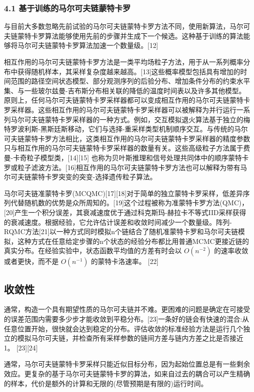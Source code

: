 \subsubsection{4.1 基于训练的马尔可夫链蒙特卡罗}

与目前大多数忽略先前试验的马尔可夫链蒙特卡罗方法不同，使用新算法，马尔可夫链蒙特卡罗算法能够使用先前的步骤并生成下一个候选。这种基于训练的算法能够将马尔可夫链蒙特卡罗算法加速一个数量级。[12]

相互作用的马尔可夫链蒙特卡罗方法是一类平均场粒子方法，用于从一系列概率分布中获得随机样本，其采样复杂度越来越高。[13]这些概率模型包括具有增加的时间范围的路径空间状态模型、部分观测序列的后验分布、增加条件分布的约束水平集、与一些玻尔兹曼-吉布斯分布相关联的降低的温度时间表以及许多其他模型。原则上，任何马尔可夫链蒙特卡罗采样器都可以变成相互作用的马尔可夫链蒙特卡罗采样器。这些相互作用的马尔可夫链蒙特卡罗采样器可以被解释为并行运行一系列马尔可夫链蒙特卡罗采样器的一种方式。例如，交互模拟退火算法基于独立的梅特罗波利斯-黑斯廷斯移动，它们与选择-重采样类型机制顺序交互。与传统的马尔可夫链蒙特卡罗方法相比，这类相互作用的马尔可夫链蒙特卡罗采样器的精度参数只与相互作用的马尔可夫链蒙特卡罗采样器的数量有关。这些高级粒子方法属于费曼-卡奇粒子模型类，[14][15] 也称为贝叶斯推理和信号处理共同体中的顺序蒙特卡罗或粒子滤波方法。[16]相互作用的马尔可夫链蒙特卡罗方法也可以解释为带有马尔可夫链蒙特卡罗突变的突变-选择遗传粒子算法。

马尔可夫链准蒙特卡罗(MCQMC)[17][18]对于简单的独立蒙特卡罗采样，低差异序列代替随机数的优势是众所周知的。[19]这个过程被称为准蒙特卡罗方法(QMC)，[20]产生一个积分误差，其衰减速度优于通过科克斯玛-赫拉卡不等式IID采样获得的衰减速度。根据经验，它允许估计误差和收敛时间减少一个数量级。阵列-RQMC方法[21]以一种方式同时模拟n个链结合了随机准蒙特卡罗和马尔可夫链模拟，这种方式在任意给定步骤的n个状态的经验分布都比用普通MCMC更接近链的真实分布。在经验实验中，状态函数平均值的方差有时会以 $O(n^{-2})$  的速率收敛或者更快，而不是 $O(n^{-1})$  的蒙特卡洛速率。 [22]

\subsection{收敛性}

通常，构造一个具有期望性质的马尔可夫链并不难。更困难的问题是确定在可接受的误差范围内需要多少步才能收敛到平稳分布。[23]一条好的链会有快速的混合:从任意位置开始，很快就会达到稳定的分布。评估收敛的标准经验方法是运行几个独立的模拟马尔可夫链，并检查所有采样参数的链间方差与链内方差之比是否接近1。 [23][24]

通常，马尔可夫链蒙特卡罗采样只能近似目标分布，因为起始位置总是有一些剩余效应。更复杂的基于马尔可夫链蒙特卡罗的算法，如来自过去的耦合可以产生精确的样本，代价是额外的计算和无限的(尽管预期是有限的)运行时间。

